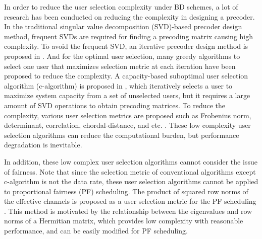 \documentclass[journal,twoside]{IEEEtranTCOM}
\begin{document}
In order to reduce the user selection complexity under BD schemes, a lot of research has been conducted on reducing the complexity in designing a precoder.
In the traditional singular value decomposition (SVD)-based  precoder design method, frequent SVDs are required for finding a precoding matrix causing high complexity. To avoid the frequent SVD, an iterative precoder design method is proposed in \cite{SRN}. And for the optimal user selection, many greedy algorithms to select one user that maximizes selection metric at each iteration have been proposed to reduce the complexity. A capacity-based suboptimal user selection algorithm (c-algorithm) is proposed in \cite{c_n}, which iteratively selects a user to maximize system capacity from a set of  unselected users, but it requires a large amount of SVD operations to obtain precoding matrices. To reduce the complexity, various user selection metrics are proposed such as Frobenius norm, determinant, correlation, chordal-distance, and etc. \cite{c_n,Determinant,Correlation1,Correlation2,CD_conf,CD_jour}. %
These low complexity user selection algorithms can reduce the computational burden, but performance degradation is inevitable.

In addition, these low complex user selection algorithms cannot consider the issue of fairness. Note that since the selection metric of conventional algorithms except c-algorithm is not the data rate, these user selection algorithms cannot be applied to proportional fairness (PF) scheduling. The product of squared row norms of the effective channels is proposed as a user selection metric for the PF scheduling \cite{SRN}. This method is motivated by the relationship between the eigenvalues and row norms of a Hermitian matrix, which provides low complexity with reasonable performance, and can be easily modified for PF scheduling.
\end{document}

